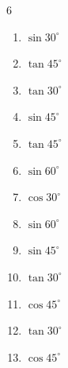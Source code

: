 \begin{multicols}{6}
\begin{enumerate}
  \item $\displaystyle \sin{30^\circ}$


  \item $\displaystyle \tan{45^\circ}$

        \phantom{$\displaystyle =1$}

\columnbreak %

  \item $\displaystyle \tan{30^\circ}$


  \item $\displaystyle \sin{45^\circ}$


  \item $\displaystyle \tan{45^\circ}$

        \phantom{$\displaystyle =1$}

  \item $\displaystyle \sin{60^\circ}$


  \item $\displaystyle \cos{30^\circ}$


  \item $\displaystyle \sin{60^\circ}$


  \item $\displaystyle \sin{45^\circ}$


  \item $\displaystyle \tan{30^\circ}$


  \item $\displaystyle \cos{45^\circ}$


  \item $\displaystyle \tan{30^\circ}$


  \item $\displaystyle \cos{45^\circ}$


\end{enumerate}
\end{multicols}
